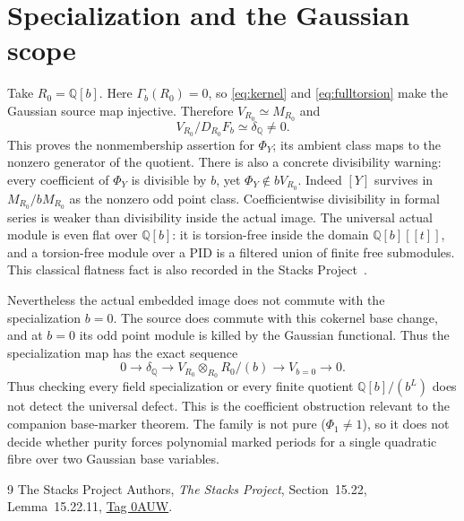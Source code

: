 \documentclass[11pt]{article}
\theoremstyle{definition}\newtheorem{definition}[theorem]{Definition}
\theoremstyle{remark}\newtheorem{remark}[theorem]{Remark}
\begin{document}
\section{Specialization and the Gaussian scope}

Take $R_0=\mathbb Q[b]$. Here $\Gamma_b(R_0)=0$, so
\eqref{eq:kernel} and \eqref{eq:fulltorsion} make the Gaussian
source map injective. Therefore $V_{R_0}\simeq M_{R_0}$ and
\[
 V_{R_0}/D_{R_0}F_b\simeq\delta_{\mathbb Q}\ne0.
\]
This proves the nonmembership assertion for $\Phi_Y$; its
ambient class maps to the nonzero generator of the quotient.
There is also a concrete divisibility warning: every coefficient
of $\Phi_Y$ is divisible by $b$, yet $\Phi_Y\notin bV_{R_0}$.
Indeed $[Y]$ survives in $M_{R_0}/bM_{R_0}$ as the nonzero
odd point class. Coefficientwise divisibility in formal series
is weaker than divisibility inside the actual image.
The universal actual module is even flat over $\mathbb Q[b]$:
it is torsion-free inside the domain $\mathbb Q[b][[t]]$, and
a torsion-free module over a PID is a filtered union of finite
free submodules. This classical flatness fact is also recorded
in the Stacks Project~\cite[Lemma~15.22.11]{Stacks}.

Nevertheless the actual embedded image does not commute with
the specialization $b=0$. The source does commute with this
cokernel base change, and at $b=0$ its odd point module is killed
by the Gaussian functional. Thus the specialization map has
the exact sequence
\[
 0\longrightarrow\delta_{\mathbb Q}
 \longrightarrow V_{R_0}\otimes_{R_0}R_0/(b)
 \longrightarrow V_{b=0}\longrightarrow0.
\]
Thus checking every field specialization or every finite quotient
$\mathbb Q[b]/(b^L)$ does not detect the universal defect. This is the
coefficient obstruction relevant to the companion base-marker theorem.
The family is not pure ($\Phi_1\ne1$), so it does not decide whether
purity forces polynomial marked periods for a single quadratic fibre
over two Gaussian base variables.


\begin{thebibliography}{9}
The Stacks Project Authors, \emph{The Stacks Project},
Section~15.22, Lemma~15.22.11,
\href{https://stacks.math.columbia.edu/tag/0AUW}{Tag 0AUW}.
\end{thebibliography}
\end{document}
